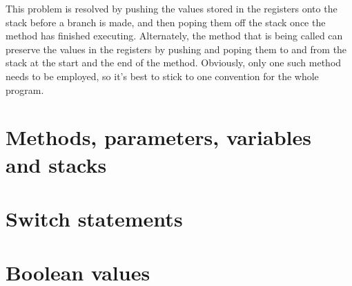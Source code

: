 \documentclass{article}
\begin{document}
This problem is resolved by pushing the values stored in the registers onto the
stack before a branch is made, and then poping them off the stack once the
method has finished executing. Alternately, the method that is being called can
preserve the values in the registers by pushing and poping them to and from the
stack at the start and the end of the method. Obviously, only one such method
needs to be employed, so it's best to stick to one convention for the whole
program.

\section{Methods, parameters, variables and stacks}
\section{Switch statements}
\section{Boolean values}
\end{document}
